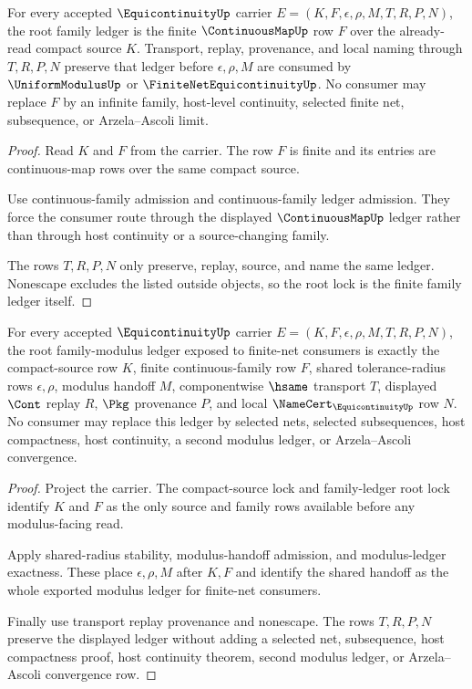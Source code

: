 \begin{theorem}
\label{thm:equicontinuity-root-family-ledger-lock}
For every accepted $\EquicontinuityUp$ carrier $E=(K,F,\epsilon,\rho,M,T,R,P,N)$, the root family ledger is the finite $\ContinuousMapUp$ row $F$ over the already-read compact source $K$. Transport, replay, provenance, and local naming through $T,R,P,N$ preserve that ledger before $\epsilon,\rho,M$ are consumed by $\UniformModulusUp$ or $\FiniteNetEquicontinuityUp$. No consumer may replace $F$ by an infinite family, host-level continuity, selected finite net, subsequence, or Arzela--Ascoli limit.
\end{theorem}
\begin{proof}
Read $K$ and $F$ from the carrier. The row $F$ is finite and its entries are continuous-map rows over the same compact source.

Use continuous-family admission and continuous-family ledger admission. They force the consumer route through the displayed $\ContinuousMapUp$ ledger rather than through host continuity or a source-changing family.

The rows $T,R,P,N$ only preserve, replay, source, and name the same ledger. Nonescape excludes the listed outside objects, so the root lock is the finite family ledger itself.
\end{proof}

\begin{theorem}
\label{thm:equicontinuity-root-family-modulus-ledger}
For every accepted $\EquicontinuityUp$ carrier $E=(K,F,\epsilon,\rho,M,T,R,P,N)$, the root family-modulus ledger exposed to finite-net consumers is exactly the compact-source row $K$, finite continuous-family row $F$, shared tolerance-radius rows $\epsilon,\rho$, modulus handoff $M$, componentwise $\hsame$ transport $T$, displayed $\Cont$ replay $R$, $\Pkg$ provenance $P$, and local $\NameCert_{\EquicontinuityUp}$ row $N$. No consumer may replace this ledger by selected nets, selected subsequences, host compactness, host continuity, a second modulus ledger, or Arzela--Ascoli convergence.
\end{theorem}
\begin{proof}
Project the carrier. The compact-source lock and family-ledger root lock identify $K$ and $F$ as the only source and family rows available before any modulus-facing read.

Apply shared-radius stability, modulus-handoff admission, and modulus-ledger exactness. These place $\epsilon,\rho,M$ after $K,F$ and identify the shared handoff as the whole exported modulus ledger for finite-net consumers.

Finally use transport replay provenance and nonescape. The rows $T,R,P,N$ preserve the displayed ledger without adding a selected net, subsequence, host compactness proof, host continuity theorem, second modulus ledger, or Arzela--Ascoli convergence row.
\end{proof}

